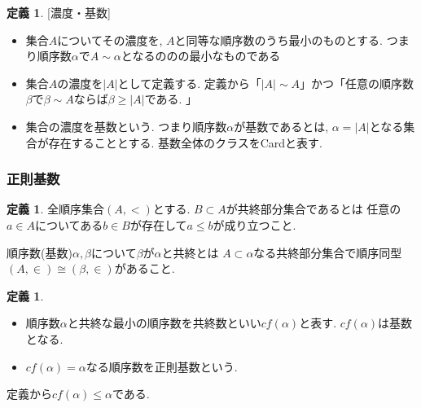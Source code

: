 \documentclass[dvipdfmx,a4paper,11pt]{report}
\theoremstyle{definition}
\newtheorem{dfn}[thm]{定義}
\begin{document}
 \begin{tcolorbox}
 [colback = white, colframe = green!35!black, fonttitle = \bfseries,breakable = true]
\begin{dfn}\cite[4.1節]{Tana}[濃度・基数]
\begin{itemize}
\item 集合$A$についてその濃度を, $A$と同等な順序数のうち最小のものとする. つまり順序数$\alpha$で$A \sim \alpha$となるののの最小なものである
\item 集合$A$の濃度を$|A|$として定義する. 定義から「$|A| \sim A$」かつ「任意の順序数$\beta$で$\beta \sim A$ならば$\beta \ge |A|$である. 」
\item 集合の濃度を基数という. つまり順序数$\alpha$が基数であるとは, $\alpha = |A|$となる集合が存在することとする. 基数全体のクラスをCardと表す.
\end{itemize}
\end{dfn}
\end{tcolorbox}

\subsubsection{正則基数}

\begin{tcolorbox}
 [colback = white, colframe = green!35!black, fonttitle = \bfseries,breakable = true]
\begin{dfn}\cite[定義4.5.1]{Tana}
全順序集合$(A,<)$とする. $B \subset A$が共終部分集合であるとは
任意の$a \in A$についてある$b \in B$が存在して$a\le b$が成り立つこと.

順序数(基数)$\alpha, \beta$について$\beta$が$\alpha$と共終とは
$A \subset \alpha$なる共終部分集合で順序同型$(A, \in) \cong (\beta, \in)$があること.
\end{dfn}
\end{tcolorbox}


 \begin{tcolorbox}
 [colback = white, colframe = green!35!black, fonttitle = \bfseries,breakable = true]
\begin{dfn}\cite[定義4.5.2]{Tana}
\begin{itemize}
\item 順序数$\alpha$と共終な最小の順序数を共終数といい$cf(\alpha)$と表す. 
$cf(\alpha)$は基数となる.  
\item $cf(\alpha) = \alpha$なる順序数を正則基数という. 
\end{itemize}
\end{dfn}
\end{tcolorbox}
定義から$cf(\alpha)\le \alpha$である. 
\end{document}
